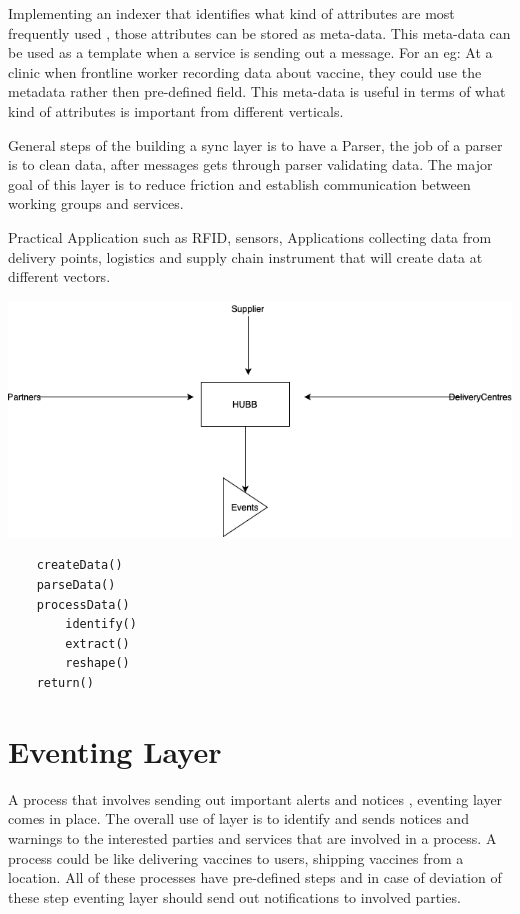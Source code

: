 \documentclass{article}
\begin{document}
Implementing an indexer that identifies what kind of attributes are most frequently used , those attributes can be stored as meta-data. This meta-data can be used as a template when a service is sending out a message. For an eg: At a clinic when frontline worker recording data about vaccine, they could use the metadata rather then pre-defined field. This meta-data is useful in terms of what kind of attributes is important from different verticals.

General steps of the building a sync layer is to have a Parser, the job of a parser is to clean data, after messages gets through parser validating data. The major goal of this layer is to reduce friction and establish communication between working groups and services.

Practical Application such as RFID, sensors, Applications collecting data from delivery points, logistics and supply chain instrument that will create data at different vectors.

\includegraphics[scale=0.5]{hubb}


\begin{lstlisting}
	createData()
	parseData()
	processData()
		identify()
		extract()
		reshape()
	return()	
\end{lstlisting}

   
\section{Eventing Layer}

A process that involves sending out important alerts and notices	, eventing layer comes in place. The overall use of  layer is to identify and sends notices and warnings to the interested parties and services that are involved in a process. A process could be like delivering vaccines to users, shipping vaccines from a location. All of these processes have pre-defined steps and in case of deviation of these step eventing layer should send out notifications to involved parties.
\end{document}
